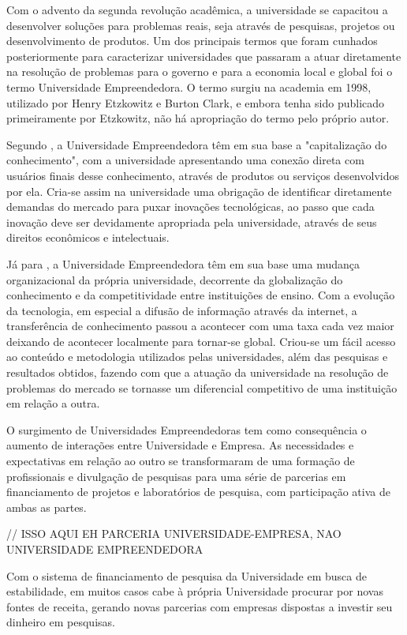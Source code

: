 Com o advento da segunda revolução acadêmica, a universidade se capacitou a desenvolver soluções para problemas reais, seja através de pesquisas, projetos ou desenvolvimento de produtos. Um dos principais termos que foram cunhados posteriormente para caracterizar universidades que passaram a atuar diretamente na resolução de problemas para o governo e para a economia local e global foi o termo Universidade Empreendedora. O termo surgiu na academia em 1998, utilizado por Henry Etzkowitz e Burton Clark, e embora tenha sido publicado primeiramente por Etzkowitz, não há apropriação do termo pelo próprio autor.

Segundo , a Universidade Empreendedora têm em sua base a "capitalização do conhecimento", com a universidade apresentando uma conexão direta com usuários finais desse conhecimento, através de produtos ou serviços desenvolvidos por ela. Cria-se assim na universidade uma obrigação de identificar diretamente demandas do mercado para puxar inovações tecnológicas, ao passo que cada inovação deve ser devidamente apropriada pela universidade, através de seus direitos econômicos e intelectuais.

Já para , a Universidade Empreendedora têm em sua base uma mudança organizacional da própria universidade, decorrente da globalização do conhecimento e da competitividade entre instituições de ensino. Com a evolução da tecnologia, em especial a difusão de informação através da internet, a transferência de conhecimento passou a acontecer com uma taxa cada vez maior deixando de acontecer localmente para tornar-se global. Criou-se um fácil acesso ao conteúdo e metodologia utilizados pelas universidades, além das pesquisas e resultados obtidos, fazendo com que a atuação da universidade na resolução de problemas do mercado se tornasse um diferencial competitivo de uma instituição em relação a outra.

O surgimento de Universidades Empreendedoras tem como consequência o aumento de interações entre Universidade e Empresa. As necessidades e expectativas em relação ao outro se transformaram de uma formação de profissionais e divulgação de pesquisas para uma série de parcerias em financiamento de projetos e laboratórios de pesquisa, com participação ativa de ambas as partes.

// ISSO AQUI EH PARCERIA UNIVERSIDADE-EMPRESA, NAO UNIVERSIDADE EMPREENDEDORA

Com o sistema de financiamento de pesquisa da Universidade em  busca de estabilidade, em muitos casos cabe à própria Universidade procurar por novas fontes de receita, gerando novas parcerias com empresas dispostas a investir seu dinheiro em pesquisas.

